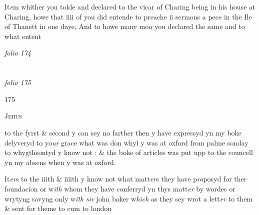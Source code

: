 \documentclass[12pt, a4paper]{book}
\begin{document}
            	
		\ifthenelse{\isodd{\thepage}}
		{\reversemarginpar}
		{\normalmarginpar}
		It\textit{e}m whither you tolde and declared to the vicar of Charing being in his house at Charing, howe that iiii of you did entende to preache ii sermons a pece in the Ile of Thanett in one daye,  And to howe many moo you declared the same and to what entent

\dotfill
						\newpage
{}

\textit{folio 174}


         \vspace*{4cm}
         
\dotfill
						  \section*{}  \subsection*{}

\textit{folio 175}



\begin{flushright}{\color{Mahogany}175}\end{flushright}
            		
				\begin{center} \begin{large} {\scshape Jehus} \end{large} \end{center}
			
            		
		\ifthenelse{\isodd{\thepage}}
		{\reversemarginpar}
		{\normalmarginpar}
		to the fyrst \& second y can sey no farther then y have expressyd yn my boke delyveryd to yo\textit{ur} grace what was don whyl y was at oxford from palme sonday to whygthsontyd y know not
			 : \& the boke of articles
			 was put upp to the  councell yn my absens when y was at oxford.
            		
		\ifthenelse{\isodd{\thepage}}
		{\reversemarginpar}
		{\normalmarginpar}
		It\textit{em} to the iiith \& iiiith y know not what matt\textit{er}s they have p\textit{ro}posyd for ther foundacion or w\textit{ith} whom they have conferryd yn thys matt\textit{er} by wordes or  wrytyng savyng only w\textit{ith} \textit{sir} john baker w\textit{hich} as they sey wrot a lett\textit{er} to them \& sent for theme to cum to london
            		
\end{document}

